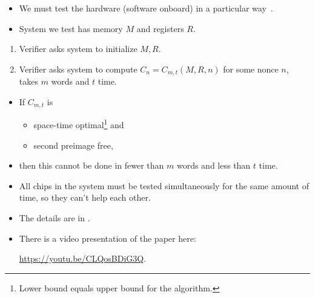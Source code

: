 \begin{frame}
  \begin{example}
    \begin{itemize}
      \item We must test the hardware (software onboard) in a particular 
        way~\cite{EstablishRootOfTrustUnconditionally}.

      \item System we test has memory \(M\) and registers \(R\).
    \end{itemize}
    \begin{enumerate}
      \item Verifier asks system to initialize \(M, R\).

      \item Verifier asks system to compute \(C_n = C_{m,t}(M, R, n)\) for some 
        nonce \(n\), takes \(m\) words and \(t\) time.
    \end{enumerate}
  \end{example}
\end{frame}

\begin{frame}
  \begin{remark}
    \begin{itemize}
      \item If \(C_{m,t}\) is
        \begin{itemize}
          \item space-time optimal\footnote{%
              Lower bound equals upper bound for the algorithm.
            } and
          \item second preimage free,
        \end{itemize}
      \item then this cannot be done in fewer than \(m\) words and less than 
        \(t\) time.
      \item All chips in the system must be tested simultaneously for the same 
        amount of time, so they can't help each other.
    \end{itemize}
  \end{remark}
\end{frame}

\begin{frame}
  \begin{remark}
    \begin{itemize}
      \item The details are in .
      \item There is a video presentation of the paper here:
        \begin{center}
          \url{https://youtu.be/CLQosBDiG3Q}.
        \end{center}
    \end{itemize}
  \end{remark}
\end{frame}
